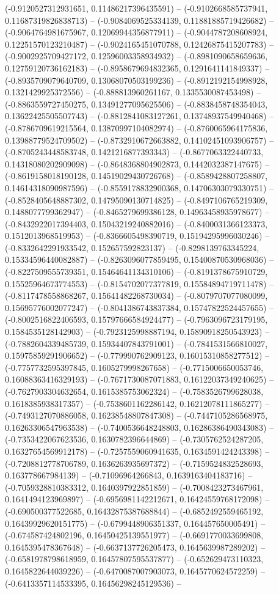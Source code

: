 (-0.9120527312931651, 0.11486217396435591) -- (-0.9102668585737941, 0.11687319826838713) -- (-0.9084069525334139, 0.11881885719426682) -- (-0.9064764981675967, 0.12069944356877911) -- (-0.9044787208608924, 0.12251570123210487) -- (-0.9024165451070788, 0.12426875415207783) -- (-0.9002925709427172, 0.12596003358934932) -- (-0.8981090658659636, 0.12759120736162183) -- (-0.8958679694832365, 0.1291641141849337) -- (-0.8935709079640709, 0.13068070503199236) -- (-0.8912192154998928, 0.1321429925372556) -- (-0.888813960261167, 0.1335530087453498) -- (-0.8863559727450275, 0.13491277095625506) -- (-0.8838458748354043, 0.13622425505507743) -- (-0.8812841083127261, 0.13748937549940468) -- (-0.8786709619215564, 0.13870997104082974) -- (-0.8760065964175836, 0.13988779524709502) -- (-0.8732910672663882, 0.14102451093906757) -- (-0.8705243448583748, 0.1421216877393343) -- (-0.8677063322440733, 0.14318080202909098) -- (-0.8648368804902873, 0.1442032387147675) -- (-0.8619158018190128, 0.14519029430726768) -- (-0.8589428807258807, 0.14614318090987596) -- (-0.8559178832900368, 0.14706303079330751) -- (-0.8528405648887302, 0.14795090130714825) -- (-0.8497106765219309, 0.1488077799362947) -- (-0.8465279699386128, 0.14963458935978677) -- (-0.8432922017394403, 0.15043219240882016) -- (-0.8400031366123373, 0.1512013968519953) -- (-0.8366605498390719, 0.15194295996030246) -- (-0.8332642291933542, 0.152657592823137) -- (-0.8298139763345224, 0.15334596440082887) -- (-0.8263096077859495, 0.15400870530968036) -- (-0.8227509555739351, 0.15464641134310106) -- (-0.8191378675910729, 0.15525964673774553) -- (-0.8154702077377819, 0.15584894719711478) -- (-0.8117478558868267, 0.15641482268730034) -- (-0.8079707077080099, 0.15695776002077247) -- (-0.8041386743837384, 0.15747822524457655) -- (-0.8002516822406593, 0.15797666584924477) -- (-0.7963096723179195, 0.1584535128142903) -- (-0.7923125998887194, 0.15890918250543923) -- (-0.7882604339485739, 0.15934407843791001) -- (-0.7841531566810027, 0.15975859291906652) -- (-0.779990762909123, 0.16015310858277512) -- (-0.7757732595397845, 0.1605279998267658) -- (-0.7715006650053746, 0.16088363416329193) -- (-0.7671730087071883, 0.16122037349240625) -- (-0.7627903304632654, 0.1615385753062324) -- (-0.7583526799628038, 0.1618385938317357) -- (-0.7538601162286142, 0.16212078111865277) -- (-0.7493127070886058, 0.16238548807847308) -- (-0.7447105286568975, 0.16263306547963538) -- (-0.7400536648248803, 0.16286386490343083) -- (-0.7353422067623536, 0.1630782396644869) -- (-0.7305762524287205, 0.16327654569912178) -- (-0.7257559060941635, 0.1634591424243398) -- (-0.7208812778706789, 0.1636263935697372) -- (-0.7159524832528693, 0.163778667984139) -- (-0.71096964266843, 0.1639163404183716) -- (-0.7059328810383312, 0.1640397922851859) -- (-0.7008423273467961, 0.1641494123969897) -- (-0.6956981142212671, 0.16424559768172098) -- (-0.690500377522685, 0.16432875387688844) -- (-0.6852492559465192, 0.16439929620151775) -- (-0.6799448906351337, 0.164457650005491) -- (-0.674587424802196, 0.16450425139551977) -- (-0.6691770033699808, 0.1645395478367648) -- (-0.6637137726205473, 0.1645639987289202) -- (-0.6581978798618959, 0.16457807595537877) -- (-0.652629473110323, 0.1645822644039226) -- (-0.6470087007903073, 0.1645770624572259) -- (-0.6413357114533395, 0.16456298245129536) -- 